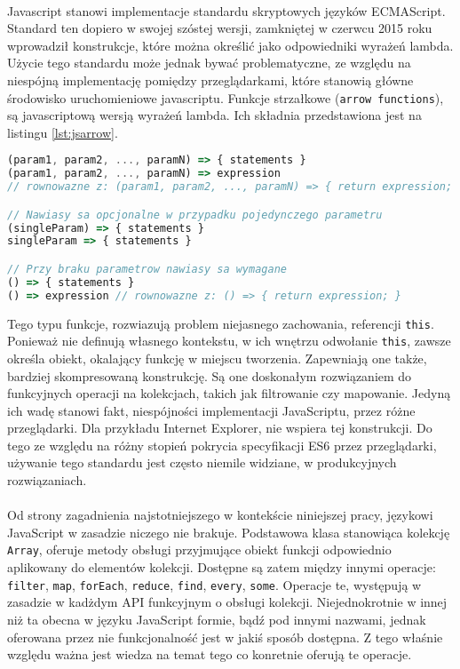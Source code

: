 \documentclass[a4paper,10pt]{report}
\begin{document}
\paragraph{}
Javascript stanowi implementacje standardu skryptowych języków ECMAScript. Standard ten dopiero w swojej szóstej wersji, zamkniętej w czerwcu 2015 roku wprowadził konstrukcje, które można określić jako odpowiedniki wyrażeń lambda. Użycie tego standardu może jednak bywać problematyczne, ze względu na niespójną implementację pomiędzy przeglądarkami, które stanowią główne środowisko uruchomieniowe javascriptu. 
Funkcje strzałkowe (\verb|arrow functions|), są javascriptową wersją wyrażeń lambda. Ich składnia przedstawiona jest na listingu \ref{lst:jsarrow}.
\begin{lstlisting}[caption={Funkcje strzałkowe \cite{lambdajssyntax}},label={lst:jsarrow},language=Javascript]
(param1, param2, ..., paramN) => { statements }
(param1, param2, ..., paramN) => expression
// rownowazne z: (param1, param2, ..., paramN) => { return expression; }

// Nawiasy sa opcjonalne w przypadku pojedynczego parametru
(singleParam) => { statements }
singleParam => { statements }

// Przy braku parametrow nawiasy sa wymagane
() => { statements }
() => expression // rownowazne z: () => { return expression; }
\end{lstlisting}
Tego typu funkcje, rozwiazują problem niejasnego zachowania, referencji \verb|this|. Ponieważ nie definują własnego kontekstu, w ich wnętrzu odwołanie \verb|this|, zawsze określa obiekt, okalający funkcję w miejscu tworzenia. Zapewniają one także, bardziej skompresowaną konstrukcję. Są one doskonałym rozwiązaniem do funkcyjnych operacji na kolekcjach, takich jak filtrowanie czy mapowanie. Jedyną ich wadę stanowi fakt, niespójności implementacji JavaScriptu, przez różne przeglądarki. Dla przykładu Internet Explorer, nie wspiera tej konstrukcji. Do tego ze względu na różny stopień pokrycia specyfikacji ES6 przez przeglądarki, używanie tego standardu jest często niemile widziane, w produkcyjnych rozwiązaniach.
\paragraph{}
Od strony zagadnienia najstotniejszego w kontekście niniejszej pracy, językowi JavaScript w zasadzie niczego nie brakuje. Podstawowa klasa stanowiąca kolekcję \verb|Array|, oferuje metody obsługi przyjmujące obiekt funkcji odpowiednio aplikowany do elementów kolekcji. Dostępne są zatem między innymi operacje: \verb|filter|, \verb|map|, \verb|forEach|, \verb|reduce|, \verb|find|, \verb|every|, \verb|some|. Operacje te, występują w zasadzie w kadżdym API funkcyjnym o obsługi kolekcji. Niejednokrotnie w innej niż ta obecna w języku JavaScript formie, bądź pod innymi nazwami, jednak oferowana przez nie funkcjonalność jest w jakiś sposób dostępna. Z tego właśnie względu ważna jest wiedza na temat tego co konretnie oferują te operacje.
\end{document}
